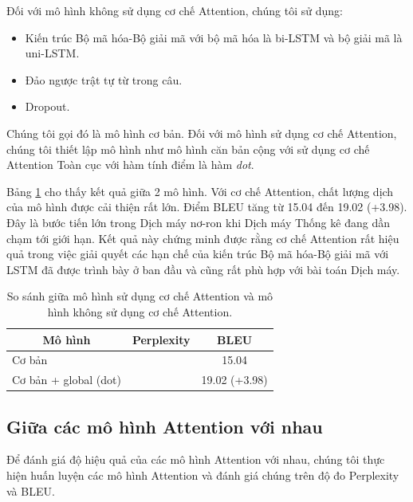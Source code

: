 Đối với mô hình không sử dụng cơ chế Attention, chúng tôi sử dụng: 
\begin{itemize}
	\item Kiến trúc Bộ mã hóa-Bộ giải mã với bộ mã hóa là bi-LSTM và bộ giải mã là uni-LSTM.
	\item Đảo ngược trật tự từ trong câu.
	\item Dropout.
\end{itemize}
Chúng tôi gọi đó là mô hình cơ bản. Đối với mô hình sử dụng cơ chế Attention, chúng tôi thiết lập mô hình như mô hình căn bản cộng với sử dụng cơ chế Attention Toàn cục với hàm tính điểm là hàm \textit{dot}.

Bảng \ref{tab_non-attn_vs_attn} cho thấy kết quả giữa 2 mô hình. Với cơ chế Attention, chất lượng dịch của mô hình được cải thiện rất lớn. Điểm BLEU tăng từ 15.04 đến 19.02 (+3.98). Đây là bước tiến lớn trong Dịch máy nơ-ron khi Dịch máy Thống kê đang dần chạm tới giới hạn. Kết quả này chứng minh được rằng cơ chế Attention rất hiệu quả trong việc giải quyết các hạn chế của kiến trúc Bộ mã hóa-Bộ giải mã với LSTM đã được trình bày ở ban đầu và cũng rất phù hợp với bài toán Dịch máy.

\begin{table}
	\centering
	\begin{tabular}{|l|l|c|} 
		\hline
		\multicolumn{1}{|c|}{\textbf{Mô hình}} & \textbf{Perplexity} & \textbf{BLEU}  \\ 
		\hline
		Cơ bản                                 &                     & 15.04          \\ 
		\hline
		Cơ bản + global (dot)                  &                     & 19.02 (+3.98)  \\
		\hline
	\end{tabular}
	\caption{So sánh giữa mô hình sử dụng cơ chế Attention và mô hình không sử dụng cơ chế Attention.}
	\label{tab_non-attn_vs_attn}
\end{table}

\subsection{Giữa các mô hình Attention với nhau}
Để đánh giá độ hiệu quả của các mô hình Attention với nhau, chúng tôi thực hiện huấn luyện các mô hình Attention và đánh giá chúng trên độ đo Perplexity và BLEU. 



